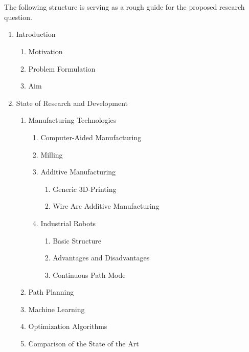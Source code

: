 \documentclass[ZLstudentexpose%
              ,optBiber%
              ,optEnglish%
              ,10pt
              ]{ZLlatex}%
\begin{document}
\section{}%
The following structure is serving as a rough guide for the proposed research question.

\begin{enumerate}
	\item Introduction	
		\begin{enumerate}
		\item Motivation
		\item Problem Formulation
		\item Aim
		\end{enumerate}
	\item State of Research and Development
		\begin{enumerate}
			\item Manufacturing Technologies
				\begin{enumerate}
				\item Computer-Aided Manufacturing
				\item Milling
				\item Additive Manufacturing
				\begin{enumerate}
					\item Generic 3D-Printing
					\item Wire Arc Additive Manufacturing 
				\end{enumerate}
					
				\item Industrial Robots
				\begin{enumerate}
					\item Basic Structure
					\item Advantages and Disadvantages 
					\item Continuous­ Path Mode
				\end{enumerate}
				\end{enumerate}
			
			\item Path Planning 
			\item Machine Learning
			\item Optimization Algorithms
			\item Comparison of the State of the Art 
		\end{enumerate}
	
	
	

\end{enumerate}
\end{document}

